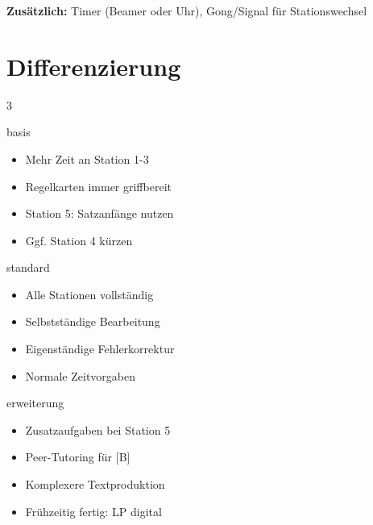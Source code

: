 \documentclass[11pt, a4paper]{article}
\begin{document}
\vspace{6pt}

\textbf{Zusätzlich:} Timer (Beamer oder Uhr), Gong/Signal für Stationswechsel


\section*{Differenzierung}

\begin{multicols}{3}

\begin{diffbox}[{[B] Basis}]{basis}
\footnotesize
\begin{itemize}[leftmargin=1em, itemsep=2pt]
    \item Mehr Zeit an Station 1-3
    \item Regelkarten immer griffbereit
    \item Station 5: Satzanfänge nutzen
    \item Ggf. Station 4 kürzen
\end{itemize}
\end{diffbox}

\columnbreak

\begin{diffbox}[{[S] Standard}]{standard}
\footnotesize
\begin{itemize}[leftmargin=1em, itemsep=2pt]
    \item Alle Stationen vollständig
    \item Selbstständige Bearbeitung
    \item Eigenständige Fehlerkorrektur
    \item Normale Zeitvorgaben
\end{itemize}
\end{diffbox}

\columnbreak

\begin{diffbox}[{[E] Erweiterung}]{erweiterung}
\footnotesize
\begin{itemize}[leftmargin=1em, itemsep=2pt]
    \item Zusatzaufgaben bei Station 5
    \item Peer-Tutoring für [B]
    \item Komplexere Textproduktion
    \item Frühzeitig fertig: LP digital
\end{itemize}
\end{diffbox}

\end{multicols}
\end{document}
